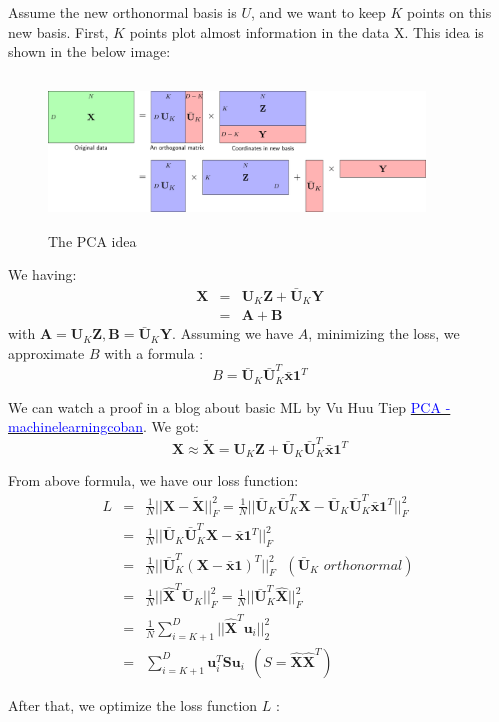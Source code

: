 \documentclass[a4paper, 12pt]{report}
\begin{document}
Assume the new orthonormal basis is $U$, and we want to keep $K$ points on this new basis. First, $K$ points plot almost information in the data X. This idea is shown in the below image:
\begin{figure}[H]
    \center
    \includegraphics[width=10cm,height=4cm]{pca_idea.png}
    \caption{The PCA idea}
\end{figure}
We having: 
\begin{eqnarray*}
  \mathbf{X} &=& \mathbf{U}_K \mathbf{Z} + \bar{\mathbf{U}}_K \mathbf{Y}\\
  &=& \mathbf{A} + \mathbf{B}
\end{eqnarray*}
\indent with $\mathbf{A} = \mathbf{U}_K \mathbf{Z}, \mathbf{B} =\bar{\mathbf{U}}_K \mathbf{Y}$. Assuming we have $A$, minimizing the loss, we approximate $B$ with a formula :
 $$B=\bar{\mathbf{U}}_K \bar{\mathbf{U}}_K^T\bar{\mathbf{x}}\mathbf{1}^T$$ 
\indent \par We can watch a proof in a blog about basic ML by Vu Huu Tiep \href{https://machinelearningcoban.com/2017/06/15/pca/}{\textcolor{blue}{PCA - machinelearningcoban}}. We got:
 $$\mathbf{X} \approx \tilde{\mathbf{X}} = \mathbf{U}_K \mathbf{Z} + \bar{\mathbf{U}}_K \bar{\mathbf{U}}_K^T\bar{\mathbf{x}}\mathbf{1}^T$$
\indent \par From above formula, we have our loss function:
\begin{eqnarray*}
    L&=& \frac{1}{N} || \mathbf{X} - \tilde{\mathbf{X}}||_F^2 = \frac{1}{N} ||\bar{\mathbf{U}}_K \bar{\mathbf{U}}_K^T \mathbf{X} -  \bar{\mathbf{U}}_K \bar{\mathbf{U}}_K^T \bar{\mathbf{x}}\mathbf{1}^T||_F^2\\
    &=& \frac{1}{N} ||\bar{\mathbf{U}}_K \bar{\mathbf{U}}_K^T \mathbf{X} -   \bar{\mathbf{x}}\mathbf{1}^T||_F^2 \  \\
    &=& \frac{1}{N} || \bar{\mathbf{U}}_K^T (\mathbf{X} -   \bar{\mathbf{x}}\mathbf{1})^T||_F^2 ~~~(\bar{\mathbf{U}}_K\,\, orthonormal)  \  \\
    &=&  \frac{1}{N} ||\hat{\mathbf{X}}^T \bar{\mathbf{U}}_K ||_F^2 = \frac{1}{N} ||\bar{\mathbf{U}}_K^T\hat{\mathbf{X}} ||_F^2  \\
    & = & \frac{1}{N}\sum_{i = K+1}^D ||\hat{\mathbf{X}}^T\mathbf{u}_i ||_2^2\\
    &=& \sum_{i=K+1}^D \mathbf{u}_i^T\mathbf{S} \mathbf{u}_i~~(S=\hat{\mathbf{X}}\hat{\mathbf{X}}^T)
\end{eqnarray*}
\indent \par After that, we optimize the loss function $L$ :
\end{document}
